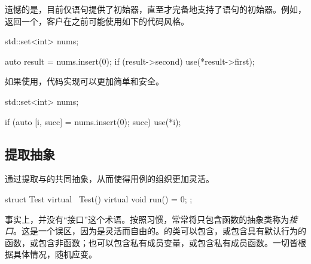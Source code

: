 \begin{content}
\begin{story}
\begin{content}
遗憾的是，目前仅语句提供了初始器，直至才完备地支持了语句的初始器。例如，返回一个，客户在之前可能使用如下的代码风格。

\begin{leftbar}
 \begin{c++}[caption={\ttfamily{插入元素：C++17之前}}]
std::set<int> nums;

auto result = nums.insert(0);
if (result->second) {
  use(*result->first);
}
 \end{c++}
\end{leftbar}

如果使用，代码实现可以更加简单和安全。

\begin{leftbar}
 \begin{c++}[caption={\ttfamily{插入元素：if初始化器与结构性绑定，C++17}}]
std::set<int> nums;

if (auto [i, succ] = nums.insert(0); succ) {
  use(*i);
}
 \end{c++}
\end{leftbar}

\end{content}

\end{story}

\subsection{提取抽象}

通过提取与的共同抽象，从而使得用例的组织更加灵活。

\begin{leftbar}
 \begin{c++}[caption={\ttfamily{include/mars/core/Test.h}}]
struct Test {
  virtual ~Test() {}
  virtual void run() = 0;
};
 \end{c++}
\end{leftbar}

\begin{story}
  \begin{center}
  \end{center}

\begin{content}

事实上，\cpp{}并没有“接口”这个术语。按照习惯，常常将只包含函数的抽象类称为\emph{接口}。这是一个误区，因为\cpp{}是灵活而自由的。\cpp{}的类可以包含，或包含具有默认行为的函数，或包含非函数；也可以包含私有成员变量，或包含私有成员函数。一切皆根据具体情况，随机应变。


\end{content}
\end{story}
\end{content}

